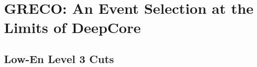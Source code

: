 \chapter{GRECO: An Event Selection at the Limits of DeepCore}

\label{sec:level3}
\section{Low-En Level 3 Cuts}

\label{sec:level4}


\label{sec:level5}


\label{sec:level6}


\label{sec:level7}


\label{sec:greco_properties}

